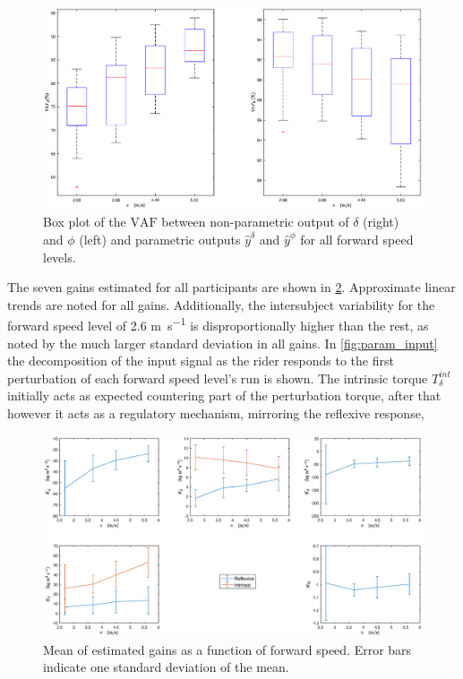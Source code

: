  \begin{figure}[h!]
    \centering

    \includegraphics[width=\linewidth]{images/steer_irf/param_fit_box.eps}
    \caption{Box plot of the  \ensuremath{\mathrm{VAF}} between non-parametric output  of \ensuremath{\delta} (right) and \ensuremath{\phi} (left) and  parametric outputs \ensuremath{\hat{y}^\delta} and \ensuremath{\hat{y}^\phi}  for all forward speed levels.}
    \label{fig:FIT_model}
\end{figure}
The seven gains estimated for all participants are shown in \cref{fig:gain_plots_steer}. Approximate linear trends are noted for all gains. Additionally, the intersubject variability for the forward speed level of 2.6 \si{\meter\per\second} is disproportionally higher than the rest, as noted by the much larger standard deviation in all gains. In \cref{fig:param_input} the decomposition of the input signal as the rider responds to the first perturbation of each forward speed level's run is shown. The intrinsic torque \ensuremath{T_\delta^{int}} initially acts as expected countering part of the perturbation torque, after that however it acts as a  regulatory mechanism, mirroring the reflexive response, 
\begin{figure}[h!]
    \centering

    \includegraphics[width=\linewidth]{images/steer_irf/param_gains_plot.eps}
    \caption{Mean of estimated gains as a function of forward speed. Error bars indicate one standard deviation of the mean.}
    \label{fig:gain_plots_steer}
\end{figure}

